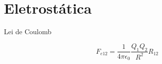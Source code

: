 \section{Eletrostática}

Lei de Coulomb

\begin{equation}
    F_{e12} = \frac{1}{4 \pi \epsilon_0 } \frac{Q_1 Q_2}{R^2} R_{12}
\end{equation}
